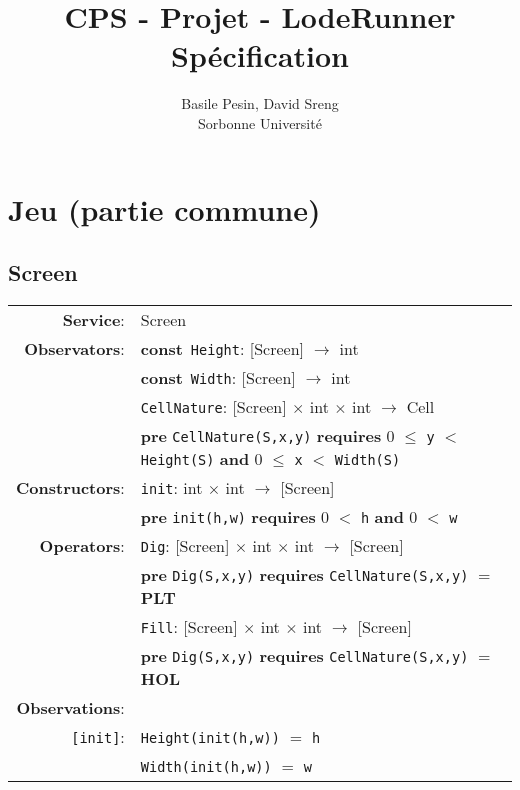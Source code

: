 \documentclass[8pt]{article}
\title{CPS - Projet - LodeRunner\\Spécification}
\author{Basile Pesin, David Sreng\\Sorbonne Université}
\begin{document}
\maketitle

\section{Jeu (partie commune)}

\subsection{Screen}

{\small
\begin{tabular}{rl}
  \textbf{Service}: & \textrm{Screen}  \\
  \textbf{Observators}: & \textbf{const}~\texttt{Height}: \textrm{[Screen]} $\rightarrow$ \textrm{int} \\
  & \textbf{const}~\texttt{Width}: \textrm{[Screen]} $\rightarrow$ \textrm{int} \\
  & \texttt{CellNature}: \textrm{[Screen]} $\times$ \textrm{int} $\times$ \textrm{int} $\rightarrow$ \textrm{Cell} \\
  & \quad \textbf{pre } \texttt{CellNature(S,x,y)} \textbf{ requires } 0 $\leq$ \texttt{y} $<$ \texttt{Height(S)} \textbf{ and } 0 $\leq$ \texttt{x} $<$ \texttt{Width(S)}\\
  \textbf{Constructors}: & \texttt{init}: \textrm{int} $\times$ \textrm{int} $\rightarrow$ \textrm{[Screen]} \\
  & \quad \textbf{pre } \texttt{init(h,w)} \textbf{ requires } 0 $<$ \texttt{h} \textbf{ and } 0 $<$ \texttt{w} \\
  \textbf{Operators}: & \texttt{Dig}: \textrm{[Screen]} $\times$ \textrm{int} $\times$ \textrm{int}  $\rightarrow$ \textrm{[Screen]} \\
  & \quad \textbf{pre } \texttt{Dig(S,x,y)} \textbf{ requires } \texttt{CellNature(S,x,y)} $=$ \textbf{PLT} \\
  & \texttt{Fill}: \textrm{[Screen]} $\times$ \textrm{int} $\times$ \textrm{int}  $\rightarrow$ \textrm{[Screen]} \\
  & \quad \textbf{pre } \texttt{Dig(S,x,y)} \textbf{ requires } \texttt{CellNature(S,x,y)} $=$ \textbf{HOL} \\
  \textbf{Observations}: & \\
  \texttt{[init]}: & \texttt{Height(init(h,w))} $=$ \texttt{h} \\
  & \texttt{Width(init(h,w))} $=$ \texttt{w} \\

\end{tabular}}
\end{document}
